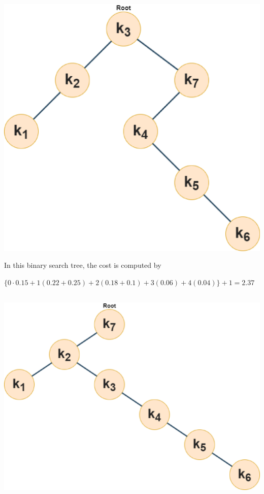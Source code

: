 \documentclass{article}
\begin{document}
\subsection{}
\begin{center}
    \includegraphics[scale=.4]{./img/4_2.eps}   %
\end{center}
In this binary search tree, the cost is computed by
\begin{center}
    $\{0 \cdot 0.15 + 1(0.22 + 0.25) + 2(0.18 + 0.1) + 3(0.06) + 4(0.04)\} + 1 = 2.37$
\end{center}
\subsection{}
\begin{center}
    \includegraphics[scale=.4]{./img/4_3.eps}   %
\end{center}
\end{document}
